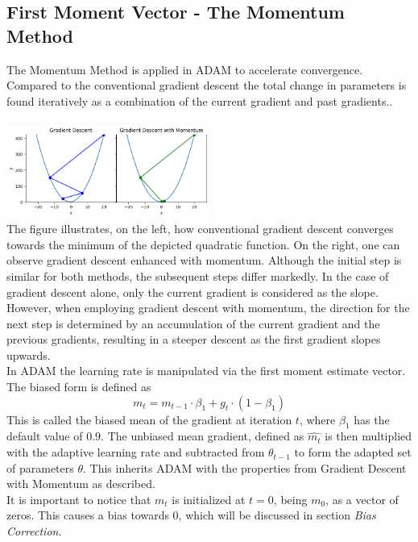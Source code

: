 \documentclass[journal]{IEEEtran}
\begin{document}
\subsection{First Moment Vector - The Momentum Method}
The Momentum Method is applied in ADAM to accelerate convergence. Compared to the conventional gradient descent the total change in parameters is found iteratively as a combination of the current gradient and past gradients.. \\\\
\includegraphics[width=0.5\textwidth]{report/figures/GD_momentum.png}\\
The figure illustrates, on the left, how conventional gradient descent converges towards the minimum of the depicted quadratic function. On the right, one can observe gradient descent enhanced with momentum. Although the initial step is similar for both methods, the subsequent steps differ markedly. In the case of gradient descent alone, only the current gradient is considered as the slope. However, when employing gradient descent with momentum, the direction for the next step is determined by an accumulation of the current gradient and the previous gradients, resulting in a steeper descent as the first gradient slopes upwards.\\
In ADAM the learning rate is manipulated via the first moment estimate vector. The biased form is defined as 
$$m_t=m_{t-1}\cdot \beta_1 + g_t\cdot (1-\beta_1)$$
This is called the biased mean of the gradient at iteration $t$, where $\beta_1$ has the default value of $0.9$. The unbiased mean gradient, defined as $\hat{m_t}$ is then multiplied with the adaptive learning rate and subtracted from $\theta_{t-1}$ to form the adapted set of parameters $\theta$. This inherits ADAM with the properties from Gradient Descent with Momentum as described.\\
It is important to notice that $m_t$ is initialized at $t=0$, being $m_0$, as a vector of zeros. This causes a bias towards $0$, which will be discussed in section \textit{Bias Correction}.
\end{document}

